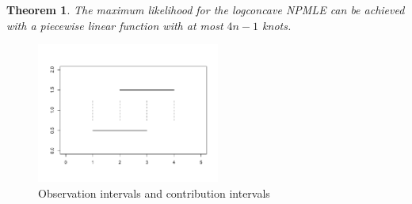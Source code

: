 \documentclass[10pt]{article}
\newtheorem{thm}{Theorem}
\begin{document}
\hspace{2mm}

	\begin{thm}
	The maximum likelihood for the logconcave NPMLE can be achieved with a piecewise linear function with at most $4n-1$ knots.
	\end{thm}
\hspace{2mm}	
	
\begin{figure}[h]
\centerline{\includegraphics[width = 6cm]{ContrbInt.pdf} }
\caption{Observation intervals and contribution intervals}
\end{figure}	
\end{document}
